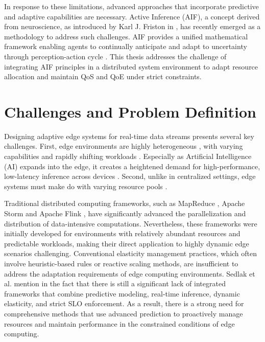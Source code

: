 In response to these limitations, advanced approaches that incorporate predictive and adaptive
capabilities are necessary. Active Inference (AIF), a concept derived from neuroscience, as introduced by Karl J. Friston in \cite{friston_free-energy_2010}, has recently emerged as a methodology to address such challenges. AIF provides a unified mathematical framework enabling agents to
continually anticipate and adapt to uncertainty through perception-action cycle \cite{friston_active_2016, lanillos_active_2021}. This thesis addresses the challenge of integrating AIF principles in a distributed system environment to adapt resource allocation and maintain QoS and QoE under strict constraints.

\section{Challenges and Problem Definition}
Designing adaptive edge systems for real-time data streams presents several key
challenges. First, edge environments are highly heterogeneous \cite{furst_elastic_2018}, with varying capabilities and
rapidly shifting workloads \cite{danilenka_adaptive_2025}. Especially as Artificial Intelligence (AI) expands into the edge, it creates a heightened demand for high-performance, low-latency inference across devices \cite{oquinn_environment-aware_2025}. Second, unlike in centralized settings, edge systems must make do with varying resource pools \cite{sedlak_equilibrium_2024}.

Traditional distributed computing frameworks, such as MapReduce \cite{dean_mapreduce_2008},
Apache Storm\cite{noauthor_apache_nodate} and Apache Flink \cite{noauthor_apache_nodate-1, carbone_apache_2015}, have significantly advanced the parallelization and
distribution of data-intensive computations. Nevertheless, these frameworks were initially
developed for environments with relatively abundant resources and predictable workloads,
making their direct application to highly dynamic edge scenarios challenging. Conventional elasticity management practices, which often involve heuristic-based rules or reactive scaling methods, are insufficient to address the adaptation requirements of edge computing environments. Sedlak et al. mention in \cite{sedlak_diffusing_2024} the fact that there is still a significant lack of integrated frameworks that combine predictive modeling, real-time inference, dynamic elasticity, and strict SLO enforcement. As a result, there is a strong need for comprehensive methods that use advanced prediction to proactively manage resources and maintain performance in the constrained conditions of edge computing.

